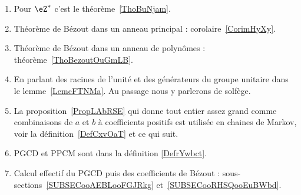  \label{THEMEooNRZHooYuuHyt}
    \begin{enumerate}
        \item
            Pour \( \eZ^*\) c'est le théorème~\ref{ThoBuNjam}.
        \item
            Théorème de Bézout dans un anneau principal : corolaire~\ref{CorimHyXy}.
        \item
            Théorème de Bézout dans un anneau de polynômes : théorème~\ref{ThoBezoutOuGmLB}.
        \item
            En parlant des racines de l'unité et des générateurs du groupe unitaire dans le lemme~\ref{LemcFTNMa}. Au passage nous y parlerons de solfège.
        \item
            La proposition~\ref{PropLAbRSE} qui donne tout entier assez grand comme combinaisons de \( a \) et \( b\) à coefficients positifs est utilisée en chaines de Markov, voir la définition~\ref{DefCxvOaT} et ce qui suit.
        \item
            PGCD et PPCM sont dans la définition \ref{DefrYwbct}.
        \item
            Calcul effectif du PGCD puis des coefficients de Bézout : sous-sections~\ref{SUBSECooAEBLooFGJRkg} et~\ref{SUBSECooRHSQooEuBWbd}.
        \end{enumerate}


